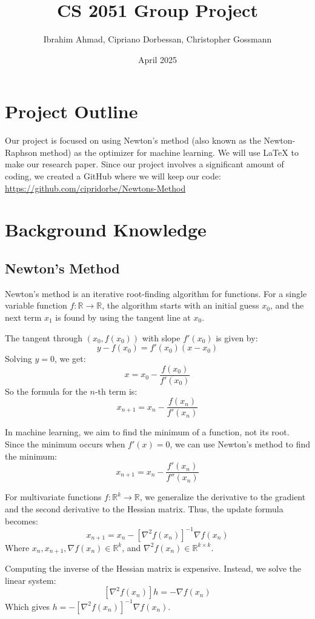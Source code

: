 \documentclass{article}
\title{CS 2051 Group Project}
\author{Ibrahim Ahmad, Cipriano Dorbessan, Christopher Gossmann}
\date{April 2025}
\begin{document}
\maketitle

\section*{Project Outline}
Our project is focused on using Newton’s method (also known as the Newton-Raphson method) as the optimizer for machine learning. We will use \LaTeX{} to make our research paper. Since our project involves a significant amount of coding, we created a GitHub where we will keep our code: \url{https://github.com/cipridorbe/Newtons-Method}

\section*{Background Knowledge}

\subsection*{Newton’s Method}
Newton’s method is an iterative root-finding algorithm for functions. For a single variable function \( f: \mathbb{R} \to \mathbb{R} \), the algorithm starts with an initial guess \( x_0 \), and the next term \( x_1 \) is found by using the tangent line at \( x_0 \).

The tangent through \( (x_0, f(x_0)) \) with slope \( f'(x_0) \) is given by:
\[
y - f(x_0) = f'(x_0)(x - x_0)
\]
Solving \( y = 0 \), we get:
\[
x = x_0 - \frac{f(x_0)}{f'(x_0)}
\]
So the formula for the \(n\)-th term is:
\[
x_{n+1} = x_n - \frac{f(x_n)}{f'(x_n)}
\]

In machine learning, we aim to find the minimum of a function, not its root. Since the minimum occurs when \( f'(x) = 0 \), we can use Newton’s method to find the minimum:
\[
x_{n+1} = x_n - \frac{f'(x_n)}{f''(x_n)}
\]

For multivariate functions \( f: \mathbb{R}^k \to \mathbb{R} \), we generalize the derivative to the gradient and the second derivative to the Hessian matrix. Thus, the update formula becomes:
\[
x_{n+1} = x_n - [\nabla^2 f(x_n)]^{-1} \nabla f(x_n)
\]
Where \( x_n, x_{n+1}, \nabla f(x_n) \in \mathbb{R}^k \), and \( \nabla^2 f(x_n) \in \mathbb{R}^{k \times k} \).

Computing the inverse of the Hessian matrix is expensive. Instead, we solve the linear system:
\[
[\nabla^2 f(x_n)] h = -\nabla f(x_n)
\]
Which gives \( h = -[\nabla^2 f(x_n)]^{-1} \nabla f(x_n) \).
\end{document}
